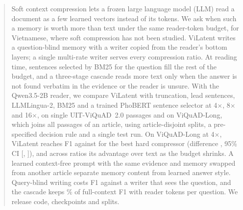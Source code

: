 \begin{abstract}
Soft context compression lets a frozen large language model (LLM) read a document as a few learned vectors instead of its tokens.
We ask when such a memory is worth more than text under the same reader-token budget, for Vietnamese, where soft compression has not been studied.
ViLatent writes a question-blind memory with a writer copied from the reader's bottom layers; a single multi-rate writer serves every compression ratio.
At reading time, sentences selected by BM25 for the question fill the rest of the budget, and a three-stage cascade reads more text only when the answer is not found verbatim in the evidence or the reader is unsure.
With the Qwen3.5-2B reader, we compare ViLatent with truncation, lead sentences, LLMLingua-2, BM25 and a trained PhoBERT sentence selector at 4$\times$, 8$\times$ and 16$\times$, on single UIT-ViQuAD~2.0 passages and on ViQuAD-Long, which joins all passages of an article, using article-disjoint splits, a pre-specified decision rule and a single test run.
On ViQuAD-Long at 4$\times$, ViLatent reaches \tbd{} F1 against \tbd{} for the best hard compressor (difference \tbd{}, 95\% CI [\tbd{}, \tbd{}]), and across ratios its advantage over text \tbd{} as the budget shrinks.
A learned context-free prompt with the same evidence and memory swapped from another article separate memory content from learned answer style.
Query-blind writing costs \tbd{} F1 against a writer that sees the question, and the cascade keeps \tbd\% of full-context F1 with \tbd{} reader tokens per question.
We release code, checkpoints and splits.

\end{abstract}
